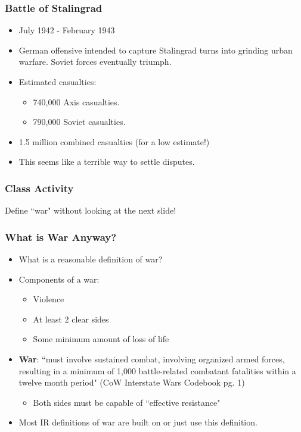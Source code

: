 \documentclass[handout]{beamer}
\begin{document}
\begin{frame} 
	\frametitle{\LARGE{Battle of Stalingrad}}	
	\begin{itemize}
		\item July 1942 - February 1943
		\item German offensive intended to capture Stalingrad turns into grinding urban warfare. Soviet forces eventually triumph. \pause
		\item Estimated casualties: 
		\begin{itemize}
			\item 740,000 Axis casualties. \pause
			\item 790,000 Soviet casualties. \pause
		\end{itemize}
		\item 1.5 million combined casualties (for a low estimate!) \pause
		\item This seems like a terrible way to settle disputes.
	\end{itemize}
\end{frame}

\begin{frame} 
	\frametitle{\LARGE{Class Activity}}	
		\begin{center}
		\LARGE Define ``war"  without looking at the next slide!
	\end{center}
\end{frame}

\begin{frame} 
	\frametitle{\LARGE{What is War Anyway?}}
	\begin{itemize}
		\item What is a reasonable definition of war? \pause
		\item Components of a war: \pause
		\begin{itemize}
			\item Violence \pause
			\item At least 2 clear sides \pause
			\item Some minimum amount of loss of life \pause
		\end{itemize}
		\item \textbf{War}: ``must involve sustained combat, involving organized armed forces, resulting in a minimum of 1,000 battle-related combatant fatalities within a twelve month period" (CoW Interstate Wars Codebook pg. 1) \pause
			\begin{itemize}
			\item Both sides must be capable of ``effective resistance" \pause
			\end{itemize}
		\item Most IR definitions of war are built on or just use this definition.
	\end{itemize}
\end{frame}
\end{document}
